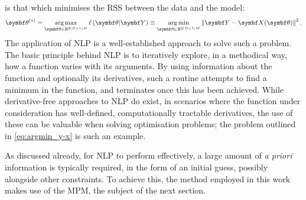 is that which minimises the \ac{RSS} between the data and the model:
\begin{equation}
    \bthstar = \argmax_{\bth \in \mathbb{R}^{2(D+1)M}}
        \ell\left(\bth \vert \bY\right) \equiv
        \argmin_{\bth \in \mathbb{R}^{2(D+1)M}} \left\lVert \bY - \bX(\bth) \right\rVert^2.
    \label{eq:argmin_y-x}
\end{equation}
The application of \ac{NLP} is a well-established approach to solve such a
problem\cite{Fletcher1987,Nocedal2006}. The basic principle behind \ac{NLP} is
to iteratively explore, in a methodical way, how a function varies with its
arguments. By using information about the function and optionally its
derivatives, such a routine attempts to find a minimum in the function, and
terminates once this has been achieved. While derivative-free approaches to
\ac{NLP} do exist\cite{Nelder1965,Kirkpatrick1983,Powell2009},
in scenarios where the function under consideration has well-defined,
computationally tractable derivatives, the use of these can be valuable when
solving optimisation problems; the problem outlined in
\cref{eq:argmin_y-x} is such an example.

As discussed already, for \ac{NLP} to perform effectively, a large amount of
\textit{a priori} information is typically required, in the form of an initial
guess, possibly alongside other constraints. To achieve this, the method
employed in this work makes use of the \ac{MPM}, the subject of the next
section.
